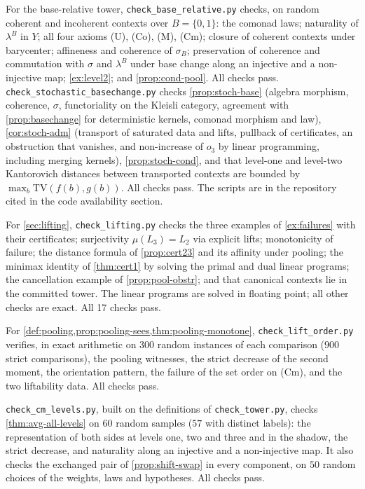 \documentclass[11pt]{article}
\theoremstyle{definition}
\theoremstyle{remark}
\begin{document}
For the base-relative tower, \texttt{check\_base\_relative.py} checks, on random coherent and
incoherent contexts over $B=\{0,1\}$: the comonad laws; naturality of $\lambda^B$ in $Y$; all four
axioms (U), (Co), (M), (Cm); closure of coherent contexts under barycenter; affineness and coherence
of $\sigma_B$; preservation of coherence and commutation with $\sigma$ and $\lambda^B$ under base change
along an injective and a non-injective map; \cref{ex:level2}; and \cref{prop:cond-pool}. All checks
pass. \texttt{check\_stochastic\allowbreak\_basechange.py} checks \cref{prop:stoch-base} (algebra
morphism, coherence, $\sigma$, functoriality on the Kleisli category, agreement with
\cref{prop:basechange} for deterministic kernels, comonad morphism and law),
\cref{cor:stoch-adm} (transport of saturated data and lifts, pullback of certificates, an obstruction
that vanishes, and non-increase of $o_3$ by linear programming, including merging kernels),
\cref{prop:stoch-cond}, and that level-one and level-two Kantorovich distances between transported
contexts are bounded by $\max_b\mathrm{TV}(f(b),g(b))$. All checks pass. The scripts are in the repository cited in the code availability section.

For \cref{sec:lifting}, \texttt{check\_lifting.py} checks the three examples of
\cref{ex:failures} with their certificates; surjectivity $\mu(L_3)=L_2$ via explicit lifts;
monotonicity of failure; the distance formula of \cref{prop:cert23} and its affinity under pooling;
the minimax identity of \cref{thm:cert1} by solving the primal and dual linear programs; the
cancellation example of \cref{prop:pool-obstr}; and that canonical contexts lie in the committed
tower. The linear programs are solved in floating point; all other checks are exact. All 17 checks
pass.

For \cref{def:pooling,prop:pooling-sees,thm:pooling-monotone}, \texttt{check\_lift\_order.py} verifies, in exact arithmetic on
$300$ random instances of each comparison ($900$ strict comparisons), the pooling witnesses, the strict decrease of the second
moment, the orientation pattern, the failure of the set order on (Cm), and the two liftability data. All checks pass.

\texttt{check\_cm\_levels.py}, built on the definitions of \texttt{check\_tower.py}, checks \cref{thm:avg-all-levels} on $60$
random samples ($57$ with distinct labels): the representation of both sides at levels one, two and three and in the shadow, the
strict decrease, and naturality along an injective and a non-injective map. It also checks the exchanged pair of
\cref{prop:shift-swap} in every component, on $50$ random choices of the weights, laws and hypotheses. All checks pass.
\end{document}
